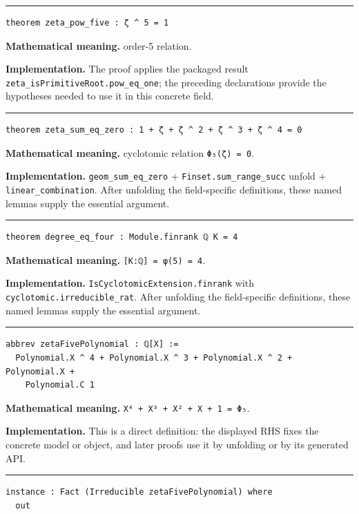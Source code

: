 \documentclass[UTF8,a4paper,11pt,fontset=fandol]{ctexart}
\theoremstyle{definition}
\newcommand{\statementsep}{\par\medskip\hrule\medskip}
\begin{document}
\statementsep
\begin{verbatim}
theorem zeta_pow_five : ζ ^ 5 = 1
\end{verbatim}
\noindent\textbf{Mathematical meaning.} order-5 relation.\par
\noindent\textbf{Implementation.} The proof applies the packaged result \texttt{zeta\_\allowbreak{}isPrimitiveRoot.\allowbreak{}pow\_\allowbreak{}eq\_\allowbreak{}one}; the preceding declarations provide the hypotheses needed to use it in this concrete field.\par
\statementsep
\begin{verbatim}
theorem zeta_sum_eq_zero : 1 + ζ + ζ ^ 2 + ζ ^ 3 + ζ ^ 4 = 0
\end{verbatim}
\noindent\textbf{Mathematical meaning.} cyclotomic relation \texttt{Φ₅(ζ) = 0}.\par
\noindent\textbf{Implementation.} \texttt{geom\_\allowbreak{}sum\_\allowbreak{}eq\_\allowbreak{}zero} + \texttt{Finset.\allowbreak{}sum\_\allowbreak{}range\_\allowbreak{}succ} unfold + \texttt{linear\_\allowbreak{}combination}. After unfolding the field-specific definitions, these named lemmas supply the essential argument.\par
\statementsep
\begin{verbatim}
theorem degree_eq_four : Module.finrank ℚ K = 4
\end{verbatim}
\noindent\textbf{Mathematical meaning.} \texttt{[K:ℚ] = φ(5) = 4}.\par
\noindent\textbf{Implementation.} \texttt{IsCyclotomicExtension.\allowbreak{}finrank} with \texttt{cyclotomic.\allowbreak{}irreducible\_\allowbreak{}rat}. After unfolding the field-specific definitions, these named lemmas supply the essential argument.\par
\statementsep
\begin{verbatim}
abbrev zetaFivePolynomial : ℚ[X] :=
  Polynomial.X ^ 4 + Polynomial.X ^ 3 + Polynomial.X ^ 2 + Polynomial.X +
    Polynomial.C 1
\end{verbatim}
\noindent\textbf{Mathematical meaning.} \texttt{X⁴ + X³ + X² + X + 1 = Φ₅}.\par
\noindent\textbf{Implementation.} This is a direct definition: the displayed RHS fixes the concrete model or object, and later proofs use it by unfolding or by its generated API.\par
\statementsep
\begin{verbatim}
instance : Fact (Irreducible zetaFivePolynomial) where
  out
\end{verbatim}
\end{document}
